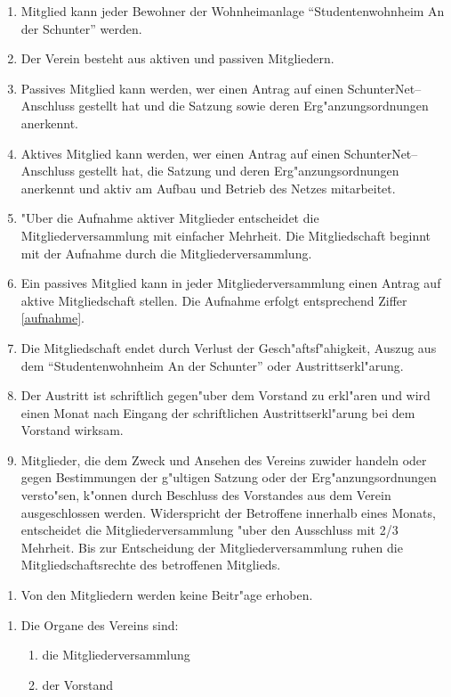 \label{mitglied}
\begin{enumerate}
\item Mitglied kann jeder Bewohner der Wohnheimanlage "`Studentenwohnheim An
  der Schunter"' werden.
\item Der Verein besteht aus aktiven und passiven Mitgliedern.
\item Passives Mitglied kann werden, wer einen Antrag auf einen
  SchunterNet--Anschluss gestellt hat und die Satzung sowie deren
  Erg"anzungsordnungen anerkennt.
\item Aktives Mitglied kann werden, wer einen Antrag auf einen
  SchunterNet--Anschluss gestellt hat, die Satzung und deren
  Erg"anzungsordnungen anerkennt und aktiv am Aufbau und Betrieb des Netzes
  mitarbeitet.
\item \label{aufnahme} "Uber die Aufnahme aktiver Mitglieder entscheidet die
  Mitgliederversammlung mit einfacher Mehrheit. Die Mitgliedschaft beginnt mit
  der Aufnahme durch die Mitgliederversammlung.
\item Ein passives Mitglied kann in jeder Mitgliederversammlung einen Antrag
  auf aktive Mitgliedschaft stellen. Die Aufnahme erfolgt entsprechend
  Ziffer \ref{aufnahme}.
\item Die Mitgliedschaft endet durch Verlust der Gesch"aftsf"ahigkeit, Auszug
  aus dem "`Studentenwohnheim An der Schunter"' oder Austrittserkl"arung.
\item Der Austritt ist schriftlich gegen"uber dem Vorstand zu erkl"aren 
  und wird einen Monat nach Eingang der schriftlichen Austrittserkl"arung bei 
  dem Vorstand wirksam.
\item \label{ausschluss}Mitglieder, die dem Zweck und Ansehen des Vereins
  zuwider handeln oder gegen Bestimmungen der g"ultigen Satzung oder der
  Erg"anzungsordnungen versto"sen, k"onnen durch Beschluss des Vorstandes aus dem
  Verein ausgeschlossen werden. Widerspricht der Betroffene innerhalb eines
  Monats, entscheidet die Mitgliederversammlung "uber den Ausschluss mit 2/3
  Mehrheit. Bis zur Entscheidung der Mitgliederversammlung ruhen die
  Mitgliedschaftsrechte des betroffenen Mitglieds.
\end{enumerate}

\begin{enumerate}
\item[] Von den Mitgliedern werden keine Beitr"age erhoben.
\end{enumerate}

\begin{enumerate}
\item[] Die Organe des Vereins sind:
  \begin{enumerate}
  \item die Mitgliederversammlung
  \item der Vorstand
  \end{enumerate}
\end{enumerate}

